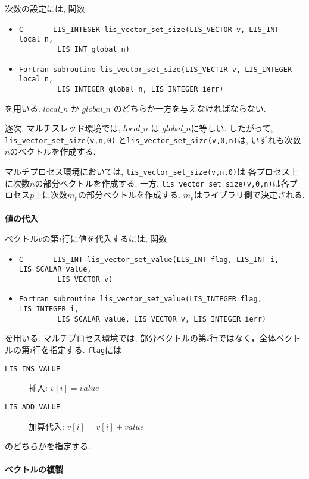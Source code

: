 \documentclass[a4paper]{jarticle}
\begin{document}
{{次数の設定には, 関数
\begin{itemize}
\item \verb|C       LIS_INTEGER lis_vector_set_size(LIS_VECTOR v, LIS_INT local_n,|\\
      \verb|         LIS_INT global_n)|
\item \verb|Fortran subroutine lis_vector_set_size(LIS_VECTIR v, LIS_INTEGER local_n,| \\
      \verb|         LIS_INTEGER global_n, LIS_INTEGER ierr)|
\end{itemize}
を用いる. 
$local\_n$ か $global\_n$ のどちらか一方を与えなければならない. 

逐次, マルチスレッド環境では, $local\_n$ $は$ $global\_n$に等しい.
したがって, 
\verb|lis_vector_set_size(v,n,0)|
と\verb|lis_vector_set_size(v,0,n)|は, いずれも次数$n$のベクトルを作成する.

マルチプロセス環境においては, \verb|lis_vector_set_size(v,n,0)|は
各プロセス上に次数$n$の部分ベクトルを作成する. 
一方, \verb|lis_vector_set_size(v,0,n)|は各プロセス$p$上に次数$m_p$の部分ベクトルを作成する. $m_p$はライブラリ側で決定される. 
\\ \\
\noindent
{\bf 値の代入}

ベクトル$v$の第$i$行に値を代入するには, 関数
\begin{itemize}
\item \verb|C       LIS_INT lis_vector_set_value(LIS_INT flag, LIS_INT i, LIS_SCALAR value,|\\
      \verb|         LIS_VECTOR v)|
\item \verb|Fortran subroutine lis_vector_set_value(LIS_INTEGER flag, LIS_INTEGER i,|\\
      \verb|         LIS_SCALAR value, LIS_VECTOR v, LIS_INTEGER ierr)|
\end{itemize}
を用いる. マルチプロセス環境では, 部分ベクトルの第$i$行ではなく，全体ベクトルの第$i$行を指定する. 
\verb+flag+には
\begin{description}
\item[\tt LIS\_INS\_VALUE] 挿入: $v[i] = value$
\item[\tt LIS\_ADD\_VALUE] 加算代入: $v[i] = v[i] + value$
\end{description}
のどちらかを指定する.
\\ \\
\noindent
{\bf ベクトルの複製}

}}
\end{document}
